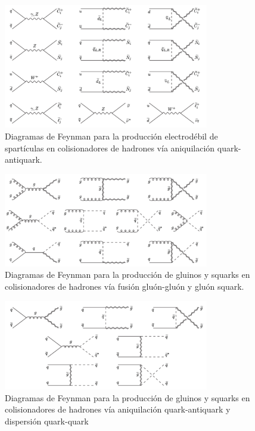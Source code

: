 \begin{figure}[!htbp]
  \centering \includegraphics[width=0.8\textwidth]{figures/figure_101}
  \caption{Diagramas de Feynman para la producción electrodébil de spartículas
    en colisionadores de hadrones vía aniquilación quark-antiquark.}
  \label{fig:ewkprod}
\end{figure}

\begin{figure}[!htbp]
  \centering \includegraphics[width=0.8\textwidth]{figures/figure_102}
  \caption{Diagramas de Feynman para la producción de gluinos y squarks en
    colisionadores de hadrones vía fusión gluón-gluón y gluón squark.}
  \label{fig:strongprod1}
\end{figure}

\begin{figure}[!htbp]
  \centering \includegraphics[width=0.8\textwidth]{figures/figure_103}
  \caption{Diagramas de Feynman para la producción de gluinos y squarks en
    colisionadores de hadrones vía aniquilación quark-antiquark y dispersión
    quark-quark}
  \label{fig:strongprod2}
\end{figure}


